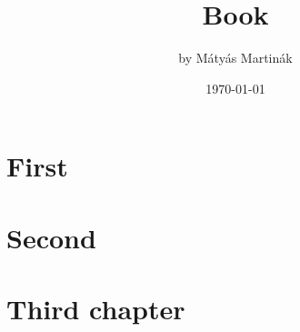 \documentclass{book}
\title{Book}
\author{by Mátyás Martinák}
\date{\today}
\begin{document}
	\frontmatter
	
	\maketitle
	\tableofcontents
	
	\mainmatter
	
	\chapter{First}
	\hulipsum[3]
	\cite{abrharber03}
	\cite{bujfaz}
	\hulipsum[1]
	\cite{g4gbin}
	\chapter{Second}
	\hulipsum
	\chapter{Third chapter}
	\hulipsum[2]
	\cite{knuth84}
	\cite{lamport94}
	\cite{tomacs21}
	
	\backmatter
	
	
	
	
	
\end{document}
